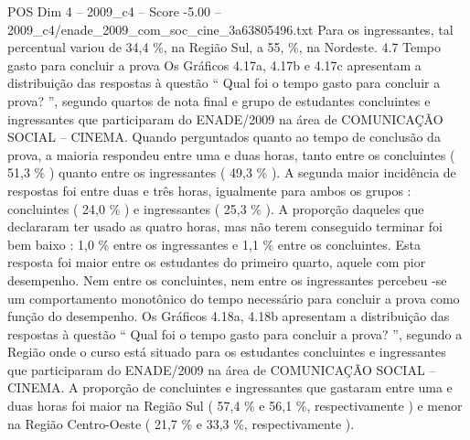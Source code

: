 \begin{textsample}{POS Dim 4 – 2009\_c4 – Score -5.00 – 2009\_c4/enade\_2009\_com\_soc\_cine\_3a63805496.txt}
Para os ingressantes, tal percentual variou de 34,4 \%, na Região Sul, a 55, \%, na Nordeste. 4.7 Tempo gasto para concluir a prova Os Gráficos 4.17a, 4.17b e 4.17c apresentam a distribuição das respostas à questão “ Qual foi o tempo gasto para concluir a prova? ”, segundo quartos de nota final e grupo de estudantes concluintes e ingressantes que participaram do ENADE/2009 na área de COMUNICAÇÃO SOCIAL – CINEMA.
Quando perguntados quanto ao tempo de conclusão da prova, a maioria respondeu entre uma e duas horas, tanto entre os concluintes ( 51,3 \% ) quanto entre os ingressantes ( 49,3 \% ).
A segunda maior incidência de respostas foi entre duas e três horas, igualmente para ambos os grupos : concluintes ( 24,0 \% ) e ingressantes ( 25,3 \% ).
A proporção daqueles que declararam ter usado as quatro horas, mas não terem conseguido terminar foi bem baixo : 1,0 \% entre os ingressantes e 1,1 \% entre os concluintes.
Esta resposta foi maior entre os estudantes do primeiro quarto, aquele com pior desempenho.
Nem entre os concluintes, nem entre os ingressantes percebeu -se um comportamento monotônico do tempo necessário para concluir a prova como função do desempenho.
Os Gráficos 4.18a, 4.18b apresentam a distribuição das respostas à questão “ Qual foi o tempo gasto para concluir a prova? ”, segundo a Região onde o curso está situado para os estudantes concluintes e ingressantes que participaram do ENADE/2009 na área de COMUNICAÇÃO SOCIAL – CINEMA.
A proporção de concluintes e ingressantes que gastaram entre uma e duas horas foi maior na Região Sul ( 57,4 \% e 56,1 \%, respectivamente ) e menor na Região Centro-Oeste ( 21,7 \% e 33,3 \%, respectivamente ).

\end{textsample}

